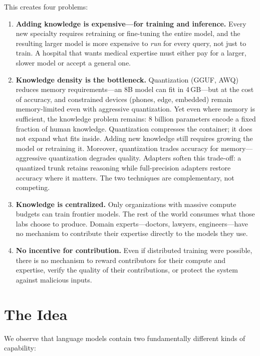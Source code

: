 \documentclass[11pt]{article}
\begin{document}
This creates four problems:
\begin{enumerate}[nosep]
\item \textbf{Adding knowledge is expensive---for training and inference.}
      Every new specialty requires retraining or fine-tuning the entire
      model, and the resulting larger model is more expensive to \emph{run}
      for every query, not just to train. A hospital that wants medical
      expertise must either pay for a larger, slower model or accept a
      general one.
\item \textbf{Knowledge density is the bottleneck.} Quantization (GGUF,
      AWQ) reduces memory requirements---an 8B model can fit in 4\,GB---but
      at the cost of accuracy, and constrained devices (phones, edge,
      embedded) remain memory-limited even with aggressive quantization.
      Yet even where memory is sufficient, the knowledge problem remains:
      8 billion parameters encode a fixed fraction of human knowledge.
      Quantization compresses the container; it does not expand what fits
      inside. Adding new knowledge still requires growing the model or
      retraining it. Moreover, quantization trades accuracy for
      memory---aggressive quantization degrades quality. Adapters soften
      this trade-off: a quantized trunk retains reasoning while
      full-precision adapters restore accuracy where it matters. The two
      techniques are complementary, not competing.
\item \textbf{Knowledge is centralized.} Only organizations with massive
      compute budgets can train frontier models. The rest of the world
      consumes what those labs choose to produce. Domain experts---doctors,
      lawyers, engineers---have no mechanism to contribute their expertise
      directly to the models they use.
\item \textbf{No incentive for contribution.} Even if distributed training
      were possible, there is no mechanism to reward contributors for their
      compute and expertise, verify the quality of their contributions, or
      protect the system against malicious inputs.
\end{enumerate}

\section{The Idea}

We observe that language models contain two fundamentally different kinds of
capability:
\end{document}
